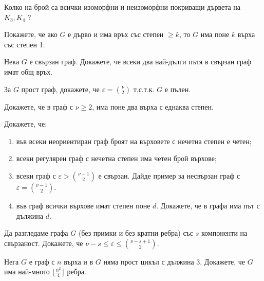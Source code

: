 \begin{problem}
  Колко на брой са всички изоморфни и неизоморфни покриващи дървета на $K_3,K_4$ ?
\end{problem}


\begin{problem}
  Покажете, че ако $G$ е дърво и има връх със степен $\geq k$, то $G$ има поне $k$ върха със степен 1.
\end{problem}

\begin{problem}
  Нека $G$ е свързан граф.
  Докажете, че всеки два най-дълги пътя в свързан граф имат общ връх.
\end{problem}

\begin{problem}
  За $G$ прост граф, докажете, че $\varepsilon = \binom{\nu}{2}$ т.с.т.к. $G$ е пълен.
\end{problem}

\begin{problem}
  Докажете, че в граф с $\nu\geq 2$, има поне два върха с еднаква степен.
\end{problem}

\begin{problem}
  Докажете, че:
  \begin{enumerate}
  \item
    във всеки неориентиран граф броят на върховете с нечетна степен е четен;
  \item
    всеки регулярен граф с нечетна степен има четен брой върхове;
  \item
    всеки граф с $\varepsilon > \binom{\nu-1}{2}$ е свързан.
    Дайде пример за несвързан граф с $\varepsilon = \binom{\nu-1}{2}$.
  \item
    във граф всички върхове имат степен поне $d$.
    Докажете, че в графа има път с дължина $d$.
  \end{enumerate}
\end{problem}


\begin{problem} %
  Да разгледаме графа $G$ (без примки и без кратни ребра) със $s$ компоненти на свързаност.
  Докажете, че $\nu - s \leq \varepsilon \leq \binom{\nu-s+1}{2}$.
\end{problem}

\begin{problem}
  Нега $G$ е граф с $n$ върха и в $G$ няма прост цикъл с дължина 3.
  Докажете, че $G$ има най-много $\lfloor{\frac{n^2}{4}}\rfloor$ ребра.
\end{problem}

